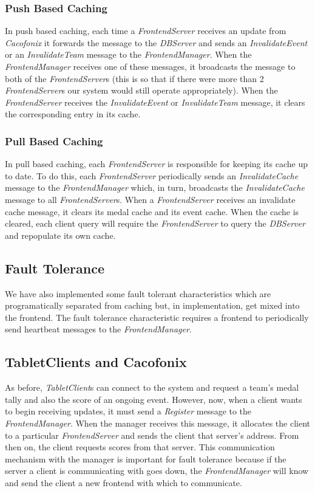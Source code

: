 \documentclass[11pt]{article}
\begin{document}
\subsubsection{Push Based Caching}
\label{subsubsec:push}
In push based caching, each time a \emph{FrontendServer} receives an
update from \emph{Cacofonix} it forwards the message to the
\emph{DBServer} and sends an \emph{InvalidateEvent} or an
\emph{InvalidateTeam} message to the \emph{FrontendManager}.  When the
\emph{FrontendManager} receives one of these messages, it broadcasts
the message to both of the \emph{FrontendServer}s (this is so that if
there were more than 2 \emph{FrontendServer}s our system would still
operate appropriately).  When the \emph{FrontendServer} receives the
\emph{InvalidateEvent} or \emph{InvalidateTeam} message, it clears the
corresponding entry in its cache.

\subsubsection{Pull Based Caching}
\label{subsubsec:pull}
In pull based caching, each \emph{FrontendServer} is responsible for
keeping its cache up to date.  To do this, each \emph{FrontendServer}
periodically sends an \emph{InvalidateCache} message to the
\emph{FrontendManager} which, in turn, broadcasts the
\emph{InvalidateCache} message to all \emph{FrontendServer}s.  When a
\emph{FrontendServer} receives an invalidate cache message, it clears
its medal cache and its event cache.  When the cache is cleared, each
client query will require the \emph{FrontendServer} to query the
\emph{DBServer} and repopulate its own cache.

\subsection{Fault Tolerance}
We have also implemented some fault tolerant characteristics which are
programatically separated from caching but, in implementation, get
mixed into the frontend.  The fault tolerance characteristic requires
a frontend to periodically send heartbeat messages to the
\emph{FrontendManager}.

\subsection{TabletClients and Cacofonix}
\label{subsec:client}
As before, \emph{TabletClient}s can connect to the system and request
a team's medal tally and also the score of an ongoing event.  However,
now, when a client wants to begin receiving updates, it must send a
\emph{Register} message to the \emph{FrontendManager}.  When the
manager receives this message, it allocates the client to a particular
\emph{FrontendServer} and sends the client that server's address.
From then on, the client requests scores from that server.  This
communication mechanism with the manager is important for fault
tolerance because if the server a client is communicating with goes
down, the \emph{FrontendManager} will know and send the client a new
frontend with which to communicate.
\end{document}
